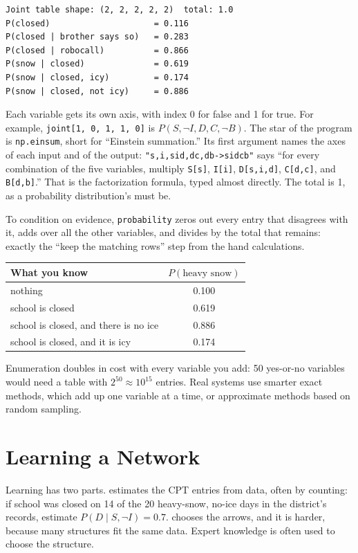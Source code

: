 \begin{verbatim}
Joint table shape: (2, 2, 2, 2, 2)  total: 1.0
P(closed)                     = 0.116
P(closed | brother says so)   = 0.283
P(closed | robocall)          = 0.866
P(snow | closed)              = 0.619
P(snow | closed, icy)         = 0.174
P(snow | closed, not icy)     = 0.886
\end{verbatim}

Each variable gets its own axis, with index 0 for false and 1 for true. For example,
\verb|joint[1, 0, 1, 1, 0]| is $P(S, \neg I, D, C, \neg B)$. The star of the program is \verb|np.einsum|, short for ``Einstein
summation.'' Its first argument names the axes of each input and of the output:
\verb|"s,i,sid,dc,db->sidcb"| says ``for every combination of the five variables, multiply \verb|S[s]|,
\verb|I[i]|, \verb|D[s,i,d]|, \verb|C[d,c]|, and \verb|B[d,b]|.'' That is the factorization formula, typed almost
directly. The total is 1, as a probability distribution's must be.

To condition on evidence, \verb|probability| zeros out every entry that disagrees with it, adds over all the
other variables, and divides by the total that remains: exactly the ``keep the matching rows'' step from the
hand calculations.

\begin{center}
\begin{tabular}{l c}
\textbf{What you know} & \textbf{$P(\text{heavy snow})$} \\
\hline
nothing & 0.100 \\
school is closed & 0.619 \\
school is closed, and there is no ice & 0.886 \\
school is closed, and it is icy & 0.174 \\
\end{tabular}
\end{center}

Enumeration doubles in cost with every variable you add: 50 yes-or-no variables would need a table with
$2^{50} \approx 10^{15}$ entries. Real systems use smarter exact methods, which add up one variable at a time, or
approximate methods based on random sampling.

\section{Learning a Network}
Learning has two parts.  estimates the CPT entries from data, often by counting:
if school was closed on 14 of the 20 heavy-snow, no-ice days in the district's records, estimate
$P(D \mid S, \neg I) = 0.7$.  chooses the arrows, and it is harder, because many
structures fit the same data. Expert knowledge is often used to choose the structure.

